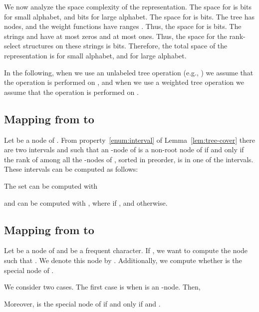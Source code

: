 \documentclass[12pt]{article}
\begin{document}
We now analyze the space complexity of the representation.
The space for  is  bits for small alphabet,
and  bits for large alphabet.
The space for  is  bits.
The tree  has  nodes, and the weight functions have ranges
. Thus, the space for  is  bits.
The strings  and  have at most  zeros and at most  ones.
Thus, the space for the rank-select structures on these strings is
 bits.
Therefore, the total space of the representation
is  for small alphabet,
and  for large alphabet.

In the following, when we use an unlabeled tree operation
(e.g., ) we assume that the operation is performed on
, and when we use a weighted tree operation  we assume that the
operation is performed on .

\subsection{Mapping from  to }

Let  be a node of .
From property~\ref{enum:interval} of Lemma~\ref{lem:tree-cover} there are
two intervals  and 
such that an -node  of  is a non-root node of 
if and only if the rank of  among all the -nodes of ,
sorted in preorder, is in one of the intervals.
These intervals can be computed as follows:

The set  can be computed with

and  can be computed with ,
where  if
,
and  otherwise.

\subsection{Mapping from  to }
Let  be a node of  and  be a frequent character.
If , we want to compute the node  such
that .
We denote this node by .
Additionally, we compute whether  is the special node of .

We consider two cases. The first case is when  is an -node.
Then,

Moreover,  is the special node of  if and only if
 and .
\end{document}
